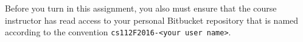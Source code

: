 \vspace*{-.05in}

Before you turn in this assignment, you also must ensure that the course instructor has read access to your personal
Bitbucket repository that is named according to the convention {\tt cs112F2016-<your user name>}.


